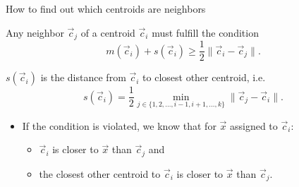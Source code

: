 \documentclass[10pt, compress]{beamer}
\newcommand{\x}{\vec{x}}
\newcommand{\cj}{\vec{c}_j}
\newcommand{\ci}{\vec{c}_i}
\newcommand{\sci}{s(\ci)}
\newcommand{\mci}{m(\ci)}
\begin{document}
\begin{frame}{How to find out which centroids are neighbors}
  \begin{theorem}
    Any neighbor $\cj$ of a centroid $\ci$ must fulfill the condition
    \begin{equation}
      m(\ci) + s(\ci) \geq \frac{1}{2} \| \ci - \cj \|.
    \end{equation}
  \end{theorem}
  $\sci$ is the distance from $\ci$ to closest other centroid, i.e.
  \begin{equation}
    \sci = \frac{1}{2} \min_{j \in \{1,2, \ldots, i-1, i+1, \ldots, k\}} \| \cj - \ci \|.
  \end{equation}
  
    \begin{itemize}
    \item If the condition is violated, we know that for $\x$ assigned to $\ci$:
    \begin{itemize}
      \item $\ci$ is closer to $\x$ than $\cj$ and
      \item the closest other centroid to $\ci$ is closer to $\x$ than $\cj$.
    \end{itemize}
  \end{itemize}
\end{frame}



\end{document}
